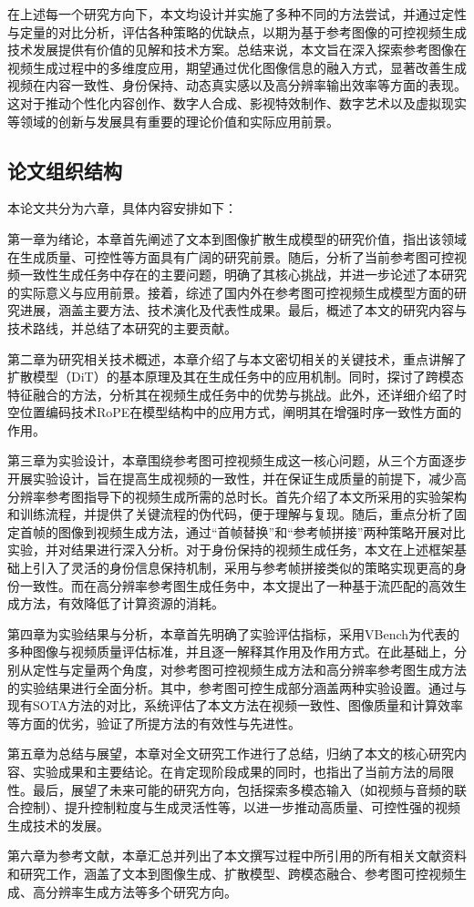 在上述每一个研究方向下，本文均设计并实施了多种不同的方法尝试，并通过定性与定量的对比分析，评估各种策略的优缺点，以期为基于参考图像的可控视频生成技术发展提供有价值的见解和技术方案。总结来说，本文旨在深入探索参考图像在视频生成过程中的多维度应用，期望通过优化图像信息的融入方式，显著改善生成视频在内容一致性、身份保持、动态真实感以及高分辨率输出效率等方面的表现。这对于推动个性化内容创作、数字人合成、影视特效制作、数字艺术以及虚拟现实等领域的创新与发展具有重要的理论价值和实际应用前景。
\subsection{论文组织结构}
本论文共分为六章，具体内容安排如下：

第一章为绪论，本章首先阐述了文本到图像扩散生成模型的研究价值，指出该领域在生成质量、可控性等方面具有广阔的研究前景。随后，分析了当前参考图可控视频一致性生成任务中存在的主要问题，明确了其核心挑战，并进一步论述了本研究的实际意义与应用前景。接着，综述了国内外在参考图可控视频生成模型方面的研究进展，涵盖主要方法、技术演化及代表性成果。最后，概述了本文的研究内容与技术路线，并总结了本研究的主要贡献。

第二章为研究相关技术概述，本章介绍了与本文密切相关的关键技术，重点讲解了扩散模型（DiT）的基本原理及其在生成任务中的应用机制。同时，探讨了跨模态特征融合的方法，分析其在视频生成任务中的优势与挑战。此外，还详细介绍了时空位置编码技术RoPE在模型结构中的应用方式，阐明其在增强时序一致性方面的作用。

第三章为实验设计，本章围绕参考图可控视频生成这一核心问题，从三个方面逐步开展实验设计，旨在提高生成视频的一致性，并在保证生成质量的前提下，减少高分辨率参考图指导下的视频生成所需的总时长。首先介绍了本文所采用的实验架构和训练流程，并提供了关键流程的伪代码，便于理解与复现。随后，重点分析了固定首帧的图像到视频生成方法，通过“首帧替换”和“参考帧拼接”两种策略开展对比实验，并对结果进行深入分析。对于身份保持的视频生成任务，本文在上述框架基础上引入了灵活的身份信息保持机制，采用与参考帧拼接类似的策略实现更高的身份一致性。而在高分辨率参考图生成任务中，本文提出了一种基于流匹配的高效生成方法，有效降低了计算资源的消耗。

第四章为实验结果与分析，本章首先明确了实验评估指标，采用VBench为代表的多种图像与视频质量评估标准，并且逐一解释其作用及作用方式。在此基础上，分别从定性与定量两个角度，对参考图可控视频生成方法和高分辨率参考图生成方法的实验结果进行全面分析。其中，参考图可控生成部分涵盖两种实验设置。通过与现有SOTA方法的对比，系统评估了本文方法在视频一致性、图像质量和计算效率等方面的优劣，验证了所提方法的有效性与先进性。

第五章为总结与展望，本章对全文研究工作进行了总结，归纳了本文的核心研究内容、实验成果和主要结论。在肯定现阶段成果的同时，也指出了当前方法的局限性。最后，展望了未来可能的研究方向，包括探索多模态输入（如视频与音频的联合控制）、提升控制粒度与生成灵活性等，以进一步推动高质量、可控性强的视频生成技术的发展。

第六章为参考文献，本章汇总并列出了本文撰写过程中所引用的所有相关文献资料和研究工作，涵盖了文本到图像生成、扩散模型、跨模态融合、参考图可控视频生成、高分辨率生成方法等多个研究方向。

